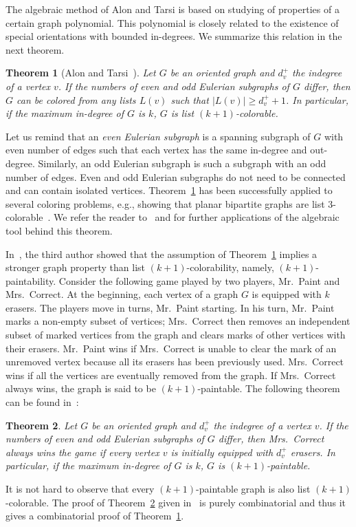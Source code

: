 \documentclass[10pt]{article}
\newtheorem{theorem}{Theorem}
\begin{document}
The algebraic method of Alon and Tarsi is based on studying of properties of a certain graph polynomial.
This polynomial is closely related to the existence of special orientations
with bounded in-degrees. We summarize this relation in the next theorem.
\begin{theorem}[Alon and Tarsi~\cite{bib-alon92+}]
\label{thm-alon-tarsi}
Let $G$ be an oriented graph and $d^+_v$ the indegree of a vertex $v$.
If the numbers of even and odd Eulerian subgraphs of $G$ differ,
then $G$ can be colored from any lists $L(v)$ such that $|L(v)|\ge d^+_v+1$.
In particular, if the maximum in-degree of $G$ is $k$, $G$ is list $(k+1)$-colorable.
\end{theorem}
Let us remind that an {\em even Eulerian subgraph} is a spanning subgraph of $G$ with even number of edges
such that each vertex has the same in-degree and out-degree.
Similarly, an odd Eulerian subgraph is such a subgraph
with an odd number of edges. Even and odd Eulerian subgraphs do not need to be connected and can contain
isolated vertices. Theorem~\ref{thm-alon-tarsi} has been successfully applied to several coloring problems,
e.g., showing that planar bipartite graphs are list $3$-colorable~\cite{bib-alon92+}.
We refer the reader to~\cite{bib-alon99} and \cite{bib-uwe08} for further applications
of the algebraic tool behind this theorem.

In~\cite{bib-uwe}, the third author showed that the assumption of Theorem~\ref{thm-alon-tarsi}
implies a stronger graph property than list $(k+1)$-colorability, namely, $(k+1)$-paintability.
Consider the following game played by two players, Mr.~Paint and Mrs.~Correct. At the beginning,
each vertex of a graph $G$ is equipped with $k$ erasers. The players move in turns, Mr.~Paint starting.
In his turn, Mr.~Paint marks a non-empty subset of vertices; Mrs.~Correct then removes an independent
subset of marked vertices from the graph and clears marks of other vertices with their erasers.
Mr.~Paint wins if Mrs.~Correct is unable to clear the mark of an unremoved vertex because all
its erasers has been previously used. Mrs.~Correct wins if all the vertices are eventually removed
from the graph. If Mrs.~Correct always wins, the graph is said to be $(k+1)$-paintable.
The following theorem can be found in~\cite{bib-uwe}:
\begin{theorem}
\label{thm-paint}
Let $G$ be an oriented graph and $d^+_v$ the indegree of a vertex $v$.
If the numbers of even and odd Eulerian subgraphs of $G$ differ,
then Mrs.~Correct always wins the game if every vertex $v$
is initially equipped with $d^+_v$ erasers.
In particular, if the maximum in-degree of $G$ is $k$, $G$ is $(k+1)$-paintable.
\end{theorem}
It is not hard to observe that every $(k+1)$-paintable graph is also list $(k+1)$-colorable.
The proof of Theorem~\ref{thm-paint} given in~\cite{bib-uwe} is purely combinatorial and
thus it gives a combinatorial proof of Theorem~\ref{thm-alon-tarsi}.
\end{document}

